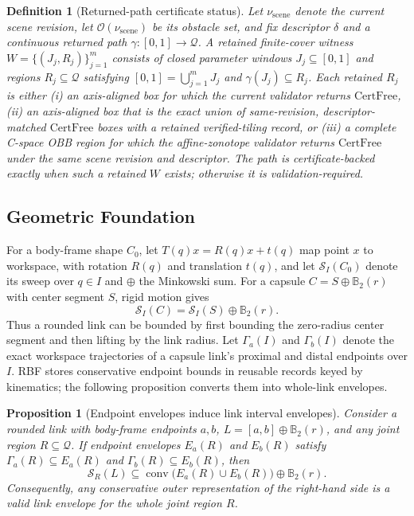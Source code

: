 \documentclass[journal]{IEEEtran}
\newtheorem{proposition}{Proposition}
\newtheorem{definition}{Definition}
\newcommand{\rbf}{RBF}
\newcommand{\Ball}{\ensuremath{\mathbb{B}}}
\newcommand{\calO}{\ensuremath{\mathcal{O}}}
\newcommand{\Q}{\ensuremath{\mathcal{Q}}}
\newcommand{\cspace}{\mbox{C-space}}
\begin{document}
\begin{definition}[Returned-path certificate status]
\label{def:path_witness}
Let $\nu_{\mathrm{scene}}$ denote the current scene revision, let
$\calO(\nu_{\mathrm{scene}})$ be its obstacle set, and fix descriptor $\delta$
and a continuous returned path $\gamma:[0,1]\rightarrow\Q$. A retained
finite-cover witness $W=\bigl\{(J_j,R_j)\bigr\}_{j=1}^{m}$ consists of closed
parameter windows $J_j\subseteq[0,1]$ and regions $R_j\subseteq\Q$ satisfying
$[0,1]=\bigcup_{j=1}^{m}J_j$ and $\gamma(J_j)\subseteq R_j$. Each retained
$R_j$ is either (i) an
axis-aligned box for which the current validator returns $\mathrm{CertFree}$,
(ii) an axis-aligned box that is the exact union of same-revision,
descriptor-matched $\mathrm{CertFree}$ boxes with a retained verified-tiling record,
or (iii) a complete \cspace{} OBB region for which the affine-zonotope validator
returns $\mathrm{CertFree}$ under the same scene revision and descriptor. The
path is certificate-backed
exactly when such a retained $W$ exists; otherwise it is validation-required.
\end{definition}

\subsection{Geometric Foundation}\label{sec:rewrite_geom}

For a body-frame shape $C_0$, let $T(q)x=R(q)x+t(q)$ map point $x$ to
workspace, with rotation $R(q)$ and translation $t(q)$, and let
$\mathcal{S}_I(C_0)$ denote its sweep over $q\in I$ and $\oplus$ the Minkowski
sum. For a capsule
$C=S\oplus\Ball_2(r)$ with center segment $S$, rigid motion gives
\[
\mathcal{S}_I(C)=\mathcal{S}_I(S)\oplus \Ball_2(r).
\]
Thus a rounded link can be bounded by first bounding the zero-radius center
segment and then lifting by the link radius. Let \(\Gamma_a(I)\) and
\(\Gamma_b(I)\) denote the exact workspace trajectories of a capsule link's
proximal and distal endpoints over \(I\). \rbf{} stores conservative endpoint
bounds in reusable records keyed by kinematics; the following proposition
converts them into whole-link envelopes.

\begin{samepage}
\begin{proposition}[Endpoint envelopes induce link interval envelopes]
\label{prop:endpoint_to_link_envelope}
Consider a rounded link with body-frame endpoints $a,b$,
$L=[a,b]\oplus \Ball_2(r)$, and any joint region $R\subseteq\Q$. If endpoint
envelopes $E_a(R)$ and $E_b(R)$ satisfy
$\Gamma_a(R)\subseteq E_a(R)$ and $\Gamma_b(R)\subseteq E_b(R)$, then
\[
\mathcal{S}_R(L)
\subseteq
\operatorname{conv}\bigl(E_a(R)\cup E_b(R)\bigr)\oplus \Ball_2(r).
\]
Consequently, any conservative outer representation of the right-hand side is a
valid link envelope for the whole joint region $R$.
\end{proposition}
\end{samepage}
\end{document}
